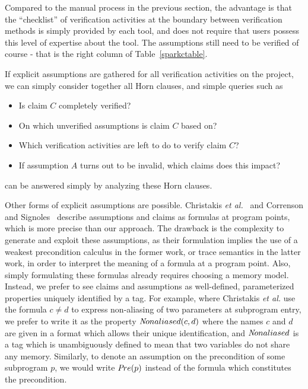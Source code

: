 \documentclass{llncs}
\newcommand{\spark}{SPARK\xspace}
\newcommand{\adatwtw}{Ada~2012\xspace}
\newcommand{\etal}{\textit{et al.}\xspace}
\begin{document}
Compared to the manual process in the previous section, the advantage is that
the ``checklist'' of verification activities at the boundary between
verification methods is simply provided by each tool, and does not require
that users possess this level of expertise about the tool. The assumptions still need to be verified of course
- that is the right column of Table~\ref{sparkctable}.

If explicit assumptions are gathered for all verification activities on
the project, we can simply consider together all Horn clauses, and simple
queries such as
\begin{itemize}
   \item Is claim $C$ completely verified?
   \item On which unverified assumptions is claim $C$ based on?
   \item Which verification activities are left to do to verify claim $C$?
   \item If assumption $A$ turns out to be invalid, which claims does this impact?
\end{itemize}
can be answered simply by analyzing these Horn clauses.

Other forms of explicit assumptions are possible. Christakis
\etal~\cite{mullerexplicit} and Correnson and Signoles~\cite{framaccombining}
describe assumptions and claims as formulas at program points, which
is more precise than our approach.
The drawback is the complexity to generate and exploit these assumptions,
as their formulation implies the use of a weakest precondition calculus in the former work,
or trace semantics in the latter work, in order to interpret the meaning of
a formula at a program point.
Also, simply formulating these formulas already requires choosing a memory model.
Instead, we prefer to see claims and assumptions as well-defined,
parameterized properties uniquely identified by a tag. For example, where Christakis \etal use the
formula $c \neq d$ to express non-aliasing of two parameters at subprogram
entry, we prefer to write it as the property ${\textit Nonaliased}(c,d)$ where
the names $c$ and $d$ are given in a format which allows their unique
identification, and ${\textit Nonaliased}$ is a tag which is
unambiguously defined to mean that two variables do not share any memory.
Similarly, to denote an assumption on the precondition of some subprogram $p$,
we would write ${\textit Pre}(p)$ instead of the formula which constitutes the
precondition.

\end{document}
